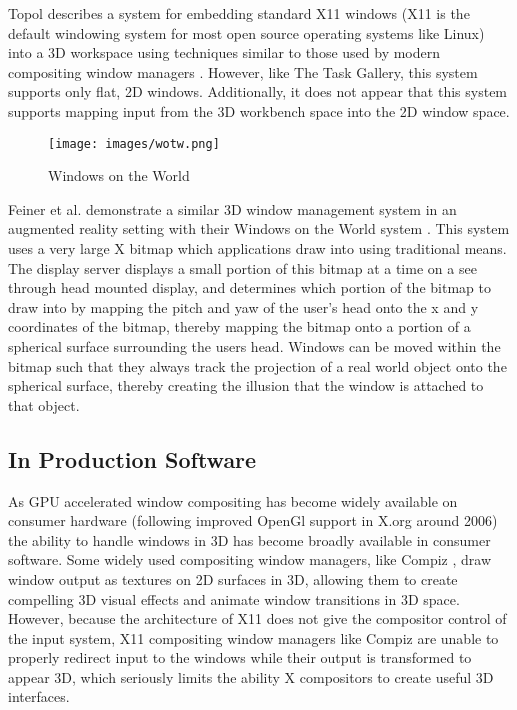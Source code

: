 
Topol describes a system for embedding standard X11 windows (X11 is the default windowing system for most open source operating systems like Linux) into a 3D workspace using techniques similar to those used by modern compositing window managers \cite{xwindow_immersion}. However, like The Task Gallery, this system supports only flat, 2D windows. Additionally, it does not appear that this system supports mapping input from the 3D workbench space into the 2D window space.

\begin{figure}[ht!]
\centering
\texttt{[image: images/wotw.png]}
\caption{Windows on the World \protect\cite{wotw}}
\end{figure}

Feiner et al. demonstrate a similar 3D window management system in an augmented reality setting with their Windows on the World system \cite{wotw}. This system uses a very large X bitmap which applications draw into using traditional means. The display server displays a small portion of this bitmap at a time on a see through head mounted display, and determines which portion of the bitmap to draw into by mapping the pitch and yaw of the user's head onto the x and y coordinates of the bitmap, thereby mapping the bitmap onto a portion of a spherical surface surrounding the users head. Windows can be moved within the bitmap such that they always track the projection of a real world object onto the spherical surface, thereby creating the illusion that the window is attached to that object.
 
\subsection{In Production Software}

As GPU accelerated window compositing has become widely available on consumer hardware (following improved OpenGl support in X.org around 2006) the ability to handle windows in 3D has become broadly available in consumer software.  Some widely used compositing window managers, like Compiz \cite{compiz}, draw window output as textures on 2D surfaces in 3D, allowing them to create compelling 3D visual effects and animate window transitions in 3D space. However, because the architecture of X11 does not give the compositor control of the input system, X11 compositing window managers like Compiz are unable to properly redirect input to the windows while their output is transformed to appear 3D, which seriously limits the ability X compositors to create useful 3D interfaces.

